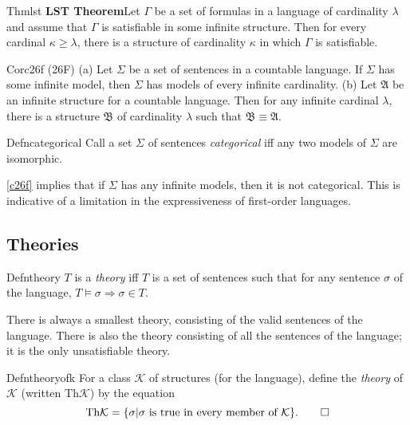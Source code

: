 

\begin{reference}{Thm}{lst}
  \textbf{LST Theorem}\quad Let $\Gamma$ be a set of formulas in a language of cardinality $\lambda$ and assume that $\Gamma$ is satisfiable in some infinite structure. Then for every cardinal $\kappa\geq \lambda$, there is a structure of cardinality $\kappa$ in which $\Gamma$ is satisfiable.
\end{reference}


\begin{reference}{Cor}{c26f}
  (26F) (a) Let $\Sigma$ be a set of sentences in a countable language. If $\Sigma$ has some infinite model, then $\Sigma$ has models of every infinite cardinality. (b) Let $\mathfrak{A}$ be an infinite structure for a countable language. Then for any infinite cardinal $\lambda$, there is a structure $\mathfrak{B}$ of cardinality $\lambda$ such that $\mathfrak{B}\equiv \mathfrak{A}$.
\end{reference}

\begin{reference}{Defn}{categorical}
  Call a set $\Sigma$ of sentences \textit{categorical} iff any two models of $\Sigma$ are isomorphic.
\end{reference}

\ref{c26f} implies that if $\Sigma$ has any infinite models, then it is not categorical. This is indicative of a limitation in the expressiveness of first-order languages.


\subsection*{Theories}

\begin{reference}{Defn}{theory}
  $T$ is a \textit{theory} iff $T$ is a set of sentences such that for any sentence $\sigma$ of the language, $T\vDash \sigma\Rightarrow \sigma\in T$.
\end{reference}

There is always a smallest theory, consisting of the valid sentences of the language. There is also the theory consisting of all the sentences of the language; it is the only unsatisfiable theory.

\begin{reference}{Defn}{theoryofk}
  For a class $\mathcal{K}$ of structures (for the language), define the \textit{theory} of $\mathcal{K}$ (written $\mathrm{Th}\mathcal{K}$) by the equation
  \[
    \mathrm{Th}\mathcal{K}=\{\sigma|\sigma\text{ is true in every member of }\mathcal{K}\}.\qedhere
  \]
\end{reference}

